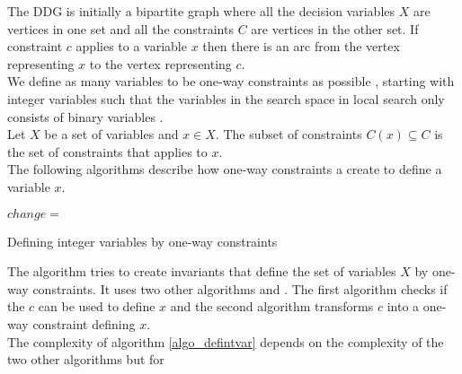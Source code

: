 The DDG is initially a bipartite graph where all the decision variables $X$ are vertices in one set and all the 
constraints $C$ are vertices in the other set. If constraint $c$ applies to a variable $x$ then there is an arc from 
the vertex representing $x$ to the vertex representing $c$. \\    
We define as many variables to be one-way constraints as possible , starting with 
integer variables such that the variables in the search space in local search only consists of binary variables 
. \\
Let $X$ be a set of variables and $x \in X$. The subset of constraints $C(x) \subseteq C$ is the set 
of constraints that applies to $x$.\\ 
The following algorithms describe how one-way constraints a create to define a variable $x$. \\ 
\IncMargin{1em}
\begin{algorithm}[H]

\algdata 
{}
\BlankLine
\Bool $change = $ \true\;
\caption{Defining integer variables by one-way constraints}\label{algo_defintvar}
\end{algorithm}\DecMargin{1em}
\noindent
The algorithm tries to create invariants that define the set of variables $X$ by one-way constraints. It uses two other 
algorithms  and . The first algorithm checks if the \cons $c$ can be used to define 
\var $x$ and the second algorithm transforms $c$ into a one-way constraint defining $x$. \\ 
The complexity of algorithm \ref{algo_defintvar} depends on the complexity of the two other algorithms but for 
